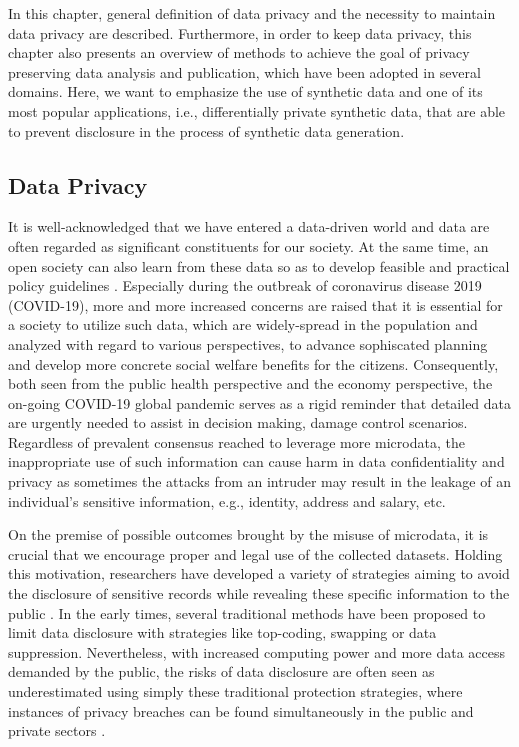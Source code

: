 In this chapter, general definition of data privacy and the necessity to maintain data privacy are described. 
Furthermore, in order to keep data privacy, this chapter also presents an overview of methods to achieve the 
goal of privacy preserving data analysis and publication, which have been adopted in several domains. 
Here, we want to emphasize the use of synthetic data and one of its most popular applications, 
i.e., differentially private synthetic data, that are able to prevent disclosure in the process of synthetic data generation.

\subsection{Data Privacy}
\label{subsec:dataprivacy}
It is well-acknowledged that we have entered a data-driven world and data are 
often regarded as significant constituents for our society. At the same time, 
an open society can also learn from these data so as to develop feasible 
and practical policy guidelines \citep{evans2021statistically}. Especially 
during the outbreak of coronavirus disease 2019 (COVID-19), more and more increased concerns are raised that it is 
essential for a society to utilize such data, which are widely-spread in the population
and analyzed with regard to various perspectives, to advance sophiscated planning
and develop more concrete social welfare benefits for the citizens. Consequently,
both seen from the public health perspective and the economy perspective, the on-going
COVID-19 global pandemic serves as a rigid reminder that detailed data are urgently 
needed to assist in decision making, damage control scenarios. Regardless of prevalent
consensus reached to leverage more microdata, the inappropriate use of such 
information can cause harm in data confidentiality and privacy as sometimes the attacks
from an intruder may result in the leakage of an individual's sensitive information, e.g., identity, 
address and salary, etc.


On the premise of possible outcomes brought by the misuse of microdata, it is crucial that 
we encourage proper and legal use of the collected datasets. Holding this motivation, researchers 
have developed a variety of strategies aiming to avoid the disclosure of sensitive records while
revealing these specific information to the public \citep{duncan2011statistical}. In the early times, 
several traditional methods have been proposed to limit data disclosure with strategies like top-coding,
swapping or data suppression. Nevertheless, with increased computing power and more data access demanded by
the public, the risks of data disclosure are often seen as underestimated using simply these traditional
protection strategies, where instances of privacy breaches can be found simultaneously in the public and 
private sectors \citep{de2015unique}.

